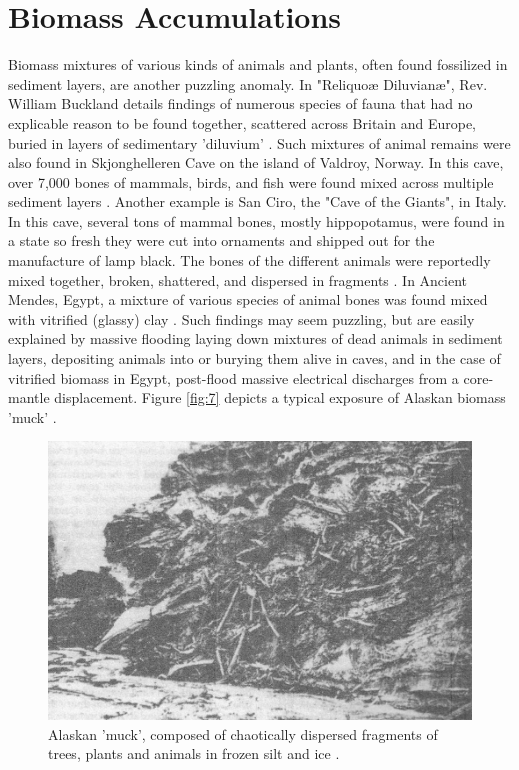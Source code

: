 \documentclass[10pt,twocolumn,letterpaper]{article}
\begin{document}
\section{Biomass Accumulations}

Biomass mixtures of various kinds of animals and plants, often found fossilized in sediment layers, are another puzzling anomaly. In "Reliquoæ Diluvianæ", Rev. William Buckland details findings of numerous species of fauna that had no explicable reason to be found together, scattered across Britain and Europe, buried in layers of sedimentary 'diluvium' \cite{58}. Such mixtures of animal remains were also found in Skjonghelleren Cave on the island of Valdroy, Norway. In this cave, over 7,000 bones of mammals, birds, and fish were found mixed across multiple sediment layers \cite{59}. Another example is San Ciro, the "Cave of the Giants", in Italy. In this cave, several tons of mammal bones, mostly hippopotamus, were found in a state so fresh they were cut into ornaments and shipped out for the manufacture of lamp black. The bones of the different animals were reportedly mixed together, broken, shattered, and dispersed in fragments \cite{60,61}. In Ancient Mendes, Egypt, a mixture of various species of animal bones was found mixed with vitrified (glassy) clay \cite{57}.  Such findings may seem puzzling, but are easily explained by massive flooding laying down mixtures of dead animals in sediment layers, depositing animals into or burying them alive in caves, and in the case of vitrified biomass in Egypt, post-flood massive electrical discharges from a core-mantle displacement. Figure \ref{fig:7} depicts a typical exposure of Alaskan biomass 'muck' \cite{56}.

\begin{figure}[t]
\begin{center}
   \includegraphics[width=1\linewidth]{muck-crop.jpeg}
\end{center}
   \caption{Alaskan 'muck', composed of chaotically dispersed fragments of trees, plants and animals in frozen silt and ice \cite{146}.}
\label{fig:7}
\label{fig:onecol}
\end{figure}
\end{document}
